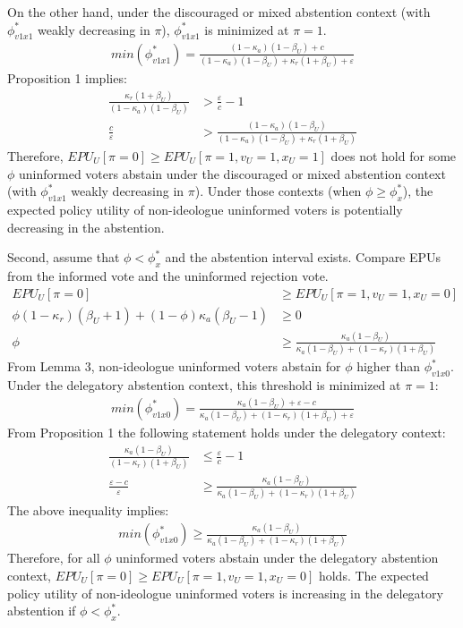 \par On the other hand, under the discouraged or mixed abstention context (with $\phi^*_{v1x1}$ weakly decreasing in $\pi$), $\phi^*_{v1x1}$ is minimized at $\pi=1$.
\begin{align*}
min(\phi^*_{v1x1}) = \frac{(1-\kappa_a)(1-\beta_U)+c}{(1-\kappa_a)(1-\beta_U)+\kappa_r(1+\beta_U)+\varepsilon}
\end{align*}
\noindent Proposition 1 implies:
\begin{align*}
\frac{\kappa_r(1+\beta_U)}{(1-\kappa_a)(1-\beta_U)} &> \frac{\varepsilon}{c} - 1\\
\frac{c}{\varepsilon} &> \frac{(1-\kappa_a)(1-\beta_U)}{(1-\kappa_a)(1-\beta_U)+\kappa_r(1+\beta_U)}
\end{align*}
\noindent Therefore, $EPU_U[\pi=0] \geq EPU_U[\pi=1,v_U=1,x_U=1]$ does not hold for some $\phi$ uninformed voters abstain under the discouraged or mixed abstention context (with $\phi^*_{v1x1}$ weakly decreasing in $\pi$). Under those contexts (when $\phi \geq \phi^*_x$), the expected policy utility of non-ideologue uninformed voters is potentially decreasing in the abstention.

\par Second, assume that $\phi < \phi^*_x$ and the abstention interval exists. Compare EPUs from the informed vote and the uninformed rejection vote.  
\begin{align*}
EPU_U[\pi=0] &\geq EPU_U[\pi=1,v_U=1,x_U=0] \\
\phi(1-\kappa_r)(\beta_U+1) + (1-\phi)\kappa_a(\beta_U-1) &\geq 0 \\
\phi &\geq \frac{\kappa_a(1-\beta_U)}{\kappa_a(1-\beta_U)+(1-\kappa_r)(1+\beta_U)}
\end{align*}
\noindent From Lemma 3, non-ideologue uninformed voters abstain for $\phi$ higher than $\phi^*_{v1x0}$. Under the delegatory abstention context, this threshold is minimized at $\pi=1$: 
\begin{align*}
min(\phi^*_{v1x0}) = \frac{\kappa_a(1-\beta_U)+\varepsilon-c}{\kappa_a(1-\beta_U)+(1-\kappa_r)(1+\beta_U)+\varepsilon}
\end{align*}
From Proposition 1 the following statement holds under the delegatory context: 
\begin{align*}
\frac{\kappa_a(1-\beta_U)}{(1-\kappa_r)(1+\beta_U)} &\leq \frac{\varepsilon}{c} - 1 \\
\frac{\varepsilon-c}{\varepsilon} &\geq \frac{\kappa_a(1-\beta_U)}{\kappa_a(1-\beta_U)+(1-\kappa_r)(1+\beta_U)}
\end{align*}
The above inequality implies:  
\begin{align*}
min(\phi^*_{v1x0}) \geq \frac{\kappa_a(1-\beta_U)}{\kappa_a(1-\beta_U)+(1-\kappa_r)(1+\beta_U)}
\end{align*}
\noindent Therefore, for all $\phi$ uninformed voters abstain under the delegatory abstention context, $EPU_U[\pi=0] \geq EPU_U[\pi=1,v_U=1,x_U=0]$ holds. The expected policy utility of non-ideologue uninformed voters is increasing in the delegatory abstention if $\phi < \phi^*_x$. 

